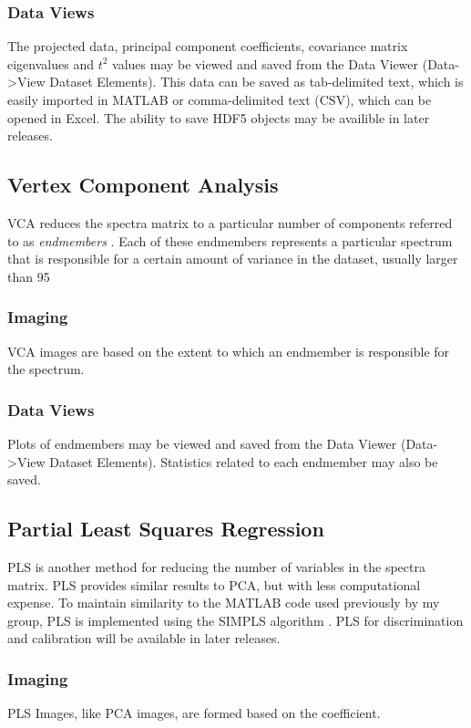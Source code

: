 \documentclass[12pt]{achemso} %
\begin{document}
\subsubsection{Data Views} The projected data, principal component coefficients,
covariance matrix eigenvalues and \(t^2\) values may be viewed and saved from
the Data Viewer (Data->View Dataset Elements). This data can be saved as
tab-delimited text, which is easily imported in MATLAB or comma-delimited text
(CSV), which can be opened in Excel. The ability to save HDF5 objects may be
availible in later releases.

\subsection{Vertex Component Analysis} VCA reduces the spectra matrix to a
particular number of components referred to as \emph{endmembers}
\cite{Nascimento2005}. Each of these endmembers represents a particular spectrum
that is responsible for a certain amount of variance in the dataset, usually
larger than 95%


\subsubsection{Imaging} VCA images are based on the extent to which an endmember
is responsible for the spectrum.

\subsubsection{Data Views} Plots of endmembers may be viewed and saved from the
Data Viewer (Data->View Dataset Elements). Statistics related to each endmember
may also be saved.

\subsection{Partial Least Squares Regression} PLS is another method for reducing
the number of variables in the spectra matrix. PLS provides similar results to
PCA, but with less computational expense. To maintain similarity to the MATLAB
code used previously by my group, PLS is implemented using the SIMPLS algorithm
\cite{deJong1993}. PLS for discrimination and calibration will be available in later releases.

\subsubsection{Imaging} PLS Images, like PCA images, are formed based on the
coefficient.
\end{document}
